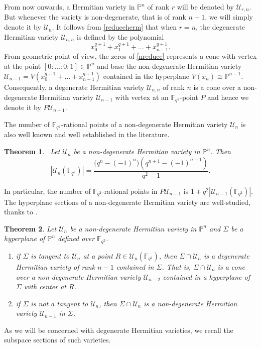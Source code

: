 \documentclass[10pt,a4paper,oneside]{amsproc}
\newtheorem{theorem}{Theorem}[section]
\newcommand{\Fqt}{\mathbb{F}_{q^2}}
\newcommand{\U}{\mathcal{U}}
\def\PP{{\mathbb P}}
\begin{document}
From now onwards, a Hermitian variety in $\PP^n$ of rank $r$ will be denoted by $\U_{r,n}$. But whenever the variety is non-degenerate, that is of rank $n+1$, we will simply denote it by $\U_n$. It follows from \eqref{reduceherm} that when $r=n$, the degenerate Hermitian variety $\U_{n,n}$ is defined by the polynomial 
\begin{equation}\label{nreduce}
 x_0^{q+1}+x_1^{q+1}+\dots+x_{n-1}^{q+1}.   
\end{equation}
From geometric point of view, the zeros of \eqref{nreduce} represents a cone with vertex at the point $[0:\dots:0:1]\in \PP^n$ and base the non-degenerate Hermitian variety $\U_{n-1}=V\left(x_0^{q+1}+\dots+x_{n-1}^{q+1}\right)$ contained in the hyperplane $V(x_n)\cong \PP^{n-1}$. Consequently, a degenerate Hermitian variety $\U_{n,n}$ of rank $n$ is a cone over a non-degenerate Hermitian variety $\U_{n-1}$ with vertex at an $\Fqt$-point $P$ and hence we denote it by $P\U_{n-1}$.

The number of $\Fqt$-rational points of a non-degenerate Hermitian variety $\U_n$ is also well known and well established in the literature.
\begin{theorem}\cite[Theorem 8.1]{BC}\label{nondeg point}\ Let $\U_n$ be a non-degenerate Hermitian variety in $\PP^n$. Then $$|\U_n(\Fqt)|=\frac{\big(q^n-(-1)^n\big)\left(q^{n+1}-(-1)^{n+1}\right)}{q^2-1}.$$
\end{theorem}

\noindent In particular, the number of $\Fqt$-rational points in $P\U_{n-1}$ is $1+q^2|\U_{n-1}(\Fqt)|$. The hyperplane sections of a non-degenerate Hermitian variety are well-studied, thanks to \cite{BC, C}.

\begin{theorem}\label{hyperplane section}
     Let $\U_n$ be a non-degenerate Hermitian variety in $\PP^n$ and $\Sigma$ be a hyperplane of $\PP^{n}$ defined over $\Fqt$. 
     \begin{enumerate}
     \item[(a)] \cite[Theorem 7.4]{BC} if $\Sigma$ is tangent to $\U_n$ at a point $R\in \U_n(\Fqt)$, then $\Sigma \cap \U_n$ is a degenerate Hermitian variety of rank $n-1$ contained in $\Sigma$. That is, 
     $\Sigma \cap \U_n$ is a cone over a non-degenerate Hermitian variety $\U_{n-2}$ contained in a hyperplane of $\Sigma$ with center at $R$. 
     \item[(b)] \cite[Theorem 3.1]{C} if $\Sigma$ is not a tangent to $\U_n$, then $\Sigma \cap \U_n$ is a non-degenerate Hermitian variety $\U_{n-1}$ in $\Sigma$.
     \end{enumerate}
     
 \end{theorem} 
As we will be concerned with degenerate Hermitian varieties, we recall the subspace sections of such varieties.
\end{document}
